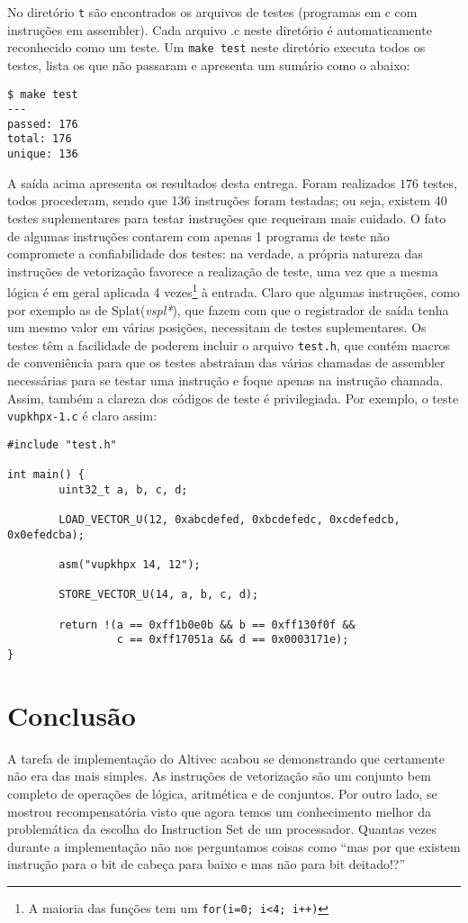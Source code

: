 \documentclass{article}
\begin{document}
No diretório \texttt{t} são encontrados os arquivos de testes
(programas em c com instruções em assembler). Cada arquivo .c neste
diretório é automaticamente reconhecido como um teste. Um \texttt{make
test} neste diretório executa todos os testes, lista os que não
passaram e apresenta um sumário como o abaixo: 
\begin{verbatim}
$ make test
---
passed: 176
total: 176
unique: 136
\end{verbatim}

A saída acima apresenta os resultados desta entrega. Foram realizados
$176$ testes, todos procederam, sendo que 136 instruções foram
testadas; ou seja, existem 40 testes suplementares para testar
instruções que requeiram mais cuidado. O fato de algumas instruções
contarem com apenas 1 programa de teste não compromete a
confiabilidade dos testes: na verdade, a própria natureza das
instruções de vetorização favorece a realização de teste, uma vez que
a mesma lógica é em geral aplicada 4 vezes\footnote{A maioria das
funções tem um \texttt{for(i=0; i<4; i++)}} à entrada. Claro que
algumas instruções, como por exemplo as de Splat(\textit{vspl*}),
que fazem com
que o registrador de saída tenha um mesmo valor em várias posições,
necessitam de testes suplementares. 
Os testes têm a facilidade de poderem incluir o arquivo
\texttt{test.h}, que contém macros de conveniência para que os testes
abstraiam das várias chamadas de assembler necessárias para se testar
uma instrução e foque apenas na instrução chamada. Assim, também a
clareza dos códigos de teste é privilegiada. Por exemplo, 
o teste \texttt{vupkhpx-1.c} é claro assim:
\begin{verbatim}
#include "test.h"

int main() {
        uint32_t a, b, c, d;

        LOAD_VECTOR_U(12, 0xabcdefed, 0xbcdefedc, 0xcdefedcb,
0x0efedcba);

        asm("vupkhpx 14, 12");

        STORE_VECTOR_U(14, a, b, c, d);

        return !(a == 0xff1b0e0b && b == 0xff130f0f &&
                 c == 0xff17051a && d == 0x0003171e);
}

\end{verbatim}


\section{Conclusão}

A tarefa de implementação do Altivec acabou se demonstrando que
certamente não era das mais simples. As instruções de vetorização são
um conjunto bem completo de operações de lógica, aritmética e de
conjuntos. Por outro lado, se mostrou recompensatória visto que agora
temos um conhecimento melhor da problemática da escolha do Instruction
Set de um processador. Quantas vezes durante a implementação não nos
perguntamos coisas como ``mas por que existem instrução para o bit de 
cabeça para baixo e mas não para bit deitado!?''
\end{document}
